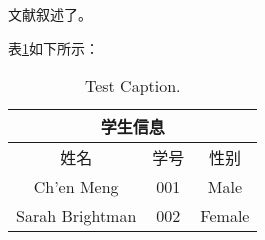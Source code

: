 \documentclass[a4paper, 12pt, centering]{article}
\makeatletter
\newcommand{\xiaosihao}{\fontsize{12pt}{\baselineskip}\selectfont}
\renewcommand\subsection{\@startsection{subsection}{1}{\z@}%
{-1.25ex \@plus -.5ex \@minus -.2ex}%
{.4ex \@plus .1ex}%
{\normalfont\xiaosihao\bf}}
\makeatother
\begin{document}
文献叙述了\cite{en1}。


表\ref{tab.main}如下所示：
\begin{table}[H]
\centering
\caption{Test Caption.}
\begin{tabular}{|c|c|c|}
\hline
\multicolumn{3}{|c|}{学生信息}\\
\hline
姓名& 学号& 性别\\
\hline
Ch'en Meng& 001& Male\\
Sarah Brightman& 002& Female\\
\hline
\end{tabular}
\label{tab.main}
\end{table}


 
\end{document}
